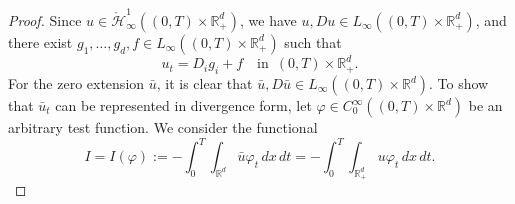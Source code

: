\documentclass[10pt,a4paper]{amsart}
\def\bR{\mathbb{R}}
\def\cH{\mathcal{H}}
\begin{document}
\begin{proof}
Since $u \in \mathring{\cH}^1_\infty((0,T)\times \bR^d_+)$, we have $u, Du \in L_\infty((0,T)\times \bR^d_+)$, and there exist $g_1, \ldots, g_d, f \in L_\infty((0,T)\times \bR^d_+)$ such that
\begin{equation}		\label{260616_eq1}
u_t = D_i g_i + f \quad \text{in }\, (0,T)\times \bR^d_+.
\end{equation}
For the zero extension $\bar{u}$, it is clear that $\bar{u}, D\bar{u} \in L_\infty((0,T)\times \bR^d)$.
To show that $\bar{u}_t$ can be represented in divergence form, let $\varphi \in C^\infty_0((0,T)\times \bR^d)$ be an arbitrary test function.
We consider the functional
$$
I = I(\varphi) := -\int_0^T \int_{\bR^d} \bar{u} \varphi_t \,dx\,dt = -\int_0^T \int_{\bR^d_+} u \varphi_t \,dx\,dt.
$$


\end{proof}
\end{document}
